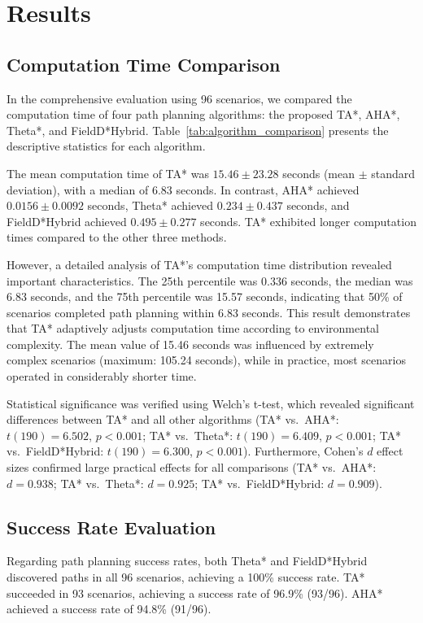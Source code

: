 \section{Results}

\subsection{Computation Time Comparison}

In the comprehensive evaluation using 96 scenarios, we compared the computation time of four path planning algorithms: the proposed TA*, AHA*, Theta*, and FieldD*Hybrid. Table~\ref{tab:algorithm_comparison} presents the descriptive statistics for each algorithm.

The mean computation time of TA* was $15.46 \pm 23.28$ seconds (mean $\pm$ standard deviation), with a median of 6.83 seconds. In contrast, AHA* achieved $0.0156 \pm 0.0092$ seconds, Theta* achieved $0.234 \pm 0.437$ seconds, and FieldD*Hybrid achieved $0.495 \pm 0.277$ seconds. TA* exhibited longer computation times compared to the other three methods.

However, a detailed analysis of TA*'s computation time distribution revealed important characteristics. The 25th percentile was 0.336 seconds, the median was 6.83 seconds, and the 75th percentile was 15.57 seconds, indicating that 50\% of scenarios completed path planning within 6.83 seconds. This result demonstrates that TA* adaptively adjusts computation time according to environmental complexity. The mean value of 15.46 seconds was influenced by extremely complex scenarios (maximum: 105.24 seconds), while in practice, most scenarios operated in considerably shorter time.

Statistical significance was verified using Welch's t-test, which revealed significant differences between TA* and all other algorithms (TA* vs.\ AHA*: $t(190) = 6.502$, $p < 0.001$; TA* vs.\ Theta*: $t(190) = 6.409$, $p < 0.001$; TA* vs.\ FieldD*Hybrid: $t(190) = 6.300$, $p < 0.001$). Furthermore, Cohen's $d$ effect sizes confirmed large practical effects for all comparisons (TA* vs.\ AHA*: $d = 0.938$; TA* vs.\ Theta*: $d = 0.925$; TA* vs.\ FieldD*Hybrid: $d = 0.909$).

\subsection{Success Rate Evaluation}

Regarding path planning success rates, both Theta* and FieldD*Hybrid discovered paths in all 96 scenarios, achieving a 100\% success rate. TA* succeeded in 93 scenarios, achieving a success rate of 96.9\% (93/96). AHA* achieved a success rate of 94.8\% (91/96).

